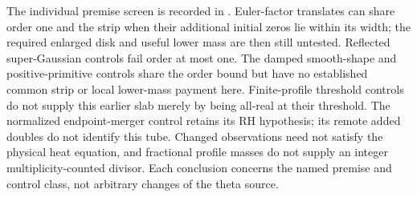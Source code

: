 The individual premise screen is recorded in \cite[\S6]{gtjoint}.
Euler-factor translates can share order one and the strip when their
additional initial zeros lie within its width; the required enlarged
disk and useful lower mass are then still untested. Reflected
super-Gaussian controls fail order at most one. The damped smooth-shape
and positive-primitive controls share the order bound but have no
established common strip or local lower-mass payment here. Finite-profile
threshold controls do not supply this earlier slab merely by being
all-real at their threshold. The normalized endpoint-merger control
retains its RH hypothesis; its remote added doubles do not identify
this tube. Changed observations need not satisfy the physical heat
equation, and fractional profile masses do not supply an integer
multiplicity-counted divisor. Each conclusion concerns the named
premise and control class, not arbitrary changes of the theta source.
